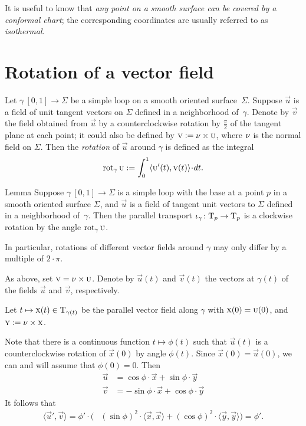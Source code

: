 It is useful to know that \textit{any point on a smooth surface can be covered by a conformal chart}; the corresponding coordinates are usually referred to as \emph{isothermal}.

\section{Rotation of a vector field}

Let $\gamma\:[0,1]\to\Sigma$ be a simple loop on a smooth oriented surface~$\Sigma$.
Suppose $\vec u$ is a field of unit tangent vectors on $\Sigma$ defined in a neighborhood of~$\gamma$.
Denote by $\vec v$ the field obtained from $\vec u$ by a counterclockwise rotation by $\tfrac{\pi}2$ of the tangent plane at each point; it could also be defined by $\text{\sc{v}}\mathrel{:=}\nu\times\text{\sc{u}}$, where $\nu$ is the normal field on $\Sigma$.
Then the \emph{rotation} of $\vec u$ around $\gamma$ is defined as the integral
\[\rot_\gamma\vec u
\df
\int_0^1\langle\vec u'(t),\vec v(t)\rangle\cdot dt.\]

\begin{thm}{Lemma}\label{lem:rotation-parallel}
Suppose $\gamma\:[0,1]\to\Sigma$ is a simple loop with the base at a point $p$ in a smooth oriented surface $\Sigma$, and $\vec u$ is a field of tangent unit vectors to $\Sigma$ defined in a neighborhood of~$\gamma$.
Then the parallel transport $\iota_\gamma\colon\mathrm{T}_p\to\mathrm{T}_p$ is a clockwise rotation by the angle $\mathop{\rm rot}\nolimits_\gamma\text{\sc{u}}$.

In particular, rotations of different vector fields around $\gamma$ may only differ by a multiple of $2\cdot\pi$.
\end{thm}

As above, set $\text{\sc{v}}=\nu\times\text{\sc{u}}$. 
Denote by $\vec u(t)$ and $\vec v(t)$ the vectors at $\gamma(t)$ of the fields $\vec u$ and $\vec v$, respectively.

Let $t\mapsto \text{\sc{x}}(t)\in \mathrm{T}_{\gamma(t)}$ be the parallel vector field along $\gamma$ with  $\vec x(0)\z=\vec u(0)$, and $\text{\sc{y}}\mathrel{:=}\nu\times\text{\sc{x}}$.

Note that there is a continuous function $t\mapsto \phi(t)$ such that 
$\vec u(t)$ is a counterclockwise rotation of $\vec x(0)$ by angle $\phi(t)$.
Since $\vec x(0)=\vec u(0)$, we can and will assume that $\phi(0)=0$.
Then
\begin{align*}
\vec u&=\cos\phi\cdot \vec x+\sin\phi\cdot \vec y
\\
\vec v&=-\sin\phi\cdot \vec x+\cos\phi\cdot \vec y
\end{align*}
It follows that 
\begin{align*}
\langle\vec u',\vec v\rangle
=\phi'\cdot\biggl(&(\sin \phi)^2\cdot \langle\vec x,\vec x\rangle+(\cos \phi)^2\cdot \langle\vec y,\vec y\rangle
\biggr)=
\phi'.
\end{align*}

